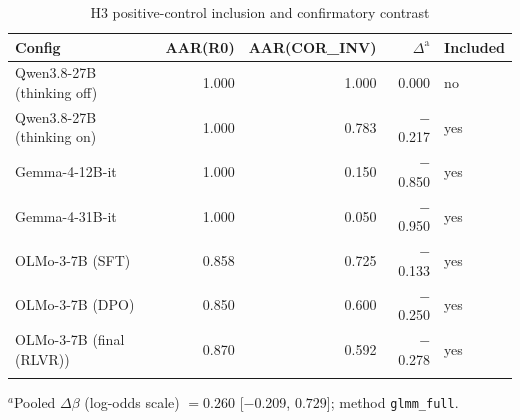 \begin{table}[t]
\centering
\caption{H3 positive-control inclusion and confirmatory contrast}
\label{tab:h3}
\begin{tabular}{lrrrl}
\toprule
Config & AAR(R0) & AAR(COR\_INV) & $\Delta^{\mathrm{a}}$ & Included \\
\midrule
Qwen3.8-27B (thinking off) & 1.000 & 1.000 & 0.000 & no \\
Qwen3.8-27B (thinking on) & 1.000 & 0.783 & $-$0.217 & yes \\
Gemma-4-12B-it & 1.000 & 0.150 & $-$0.850 & yes \\
Gemma-4-31B-it & 1.000 & 0.050 & $-$0.950 & yes \\
OLMo-3-7B (SFT) & 0.858 & 0.725 & $-$0.133 & yes \\
OLMo-3-7B (DPO) & 0.850 & 0.600 & $-$0.250 & yes \\
OLMo-3-7B (final (RLVR)) & 0.870 & 0.592 & $-$0.278 & yes \\
\botrule
\end{tabular}
\begin{tablenotes}
\item $^{a}$Pooled $\Delta\beta$ (log-odds scale) $= 0.260$ [$-$0.209, $0.729$]; method \texttt{glmm\_full}.
\end{tablenotes}
\end{table}
